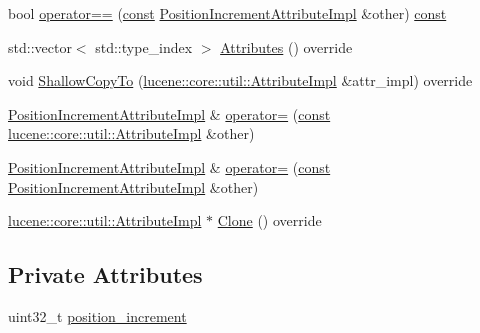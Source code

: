 \begin{DoxyCompactItemize}
\item 
bool \mbox{\hyperlink{classlucene_1_1core_1_1analysis_1_1tokenattributes_1_1PositionIncrementAttributeImpl_a5450f58da2745c914e68e7a650e78cc3}{operator==}} (\mbox{\hyperlink{ZlibCrc32_8h_a2c212835823e3c54a8ab6d95c652660e}{const}} \mbox{\hyperlink{classlucene_1_1core_1_1analysis_1_1tokenattributes_1_1PositionIncrementAttributeImpl}{Position\+Increment\+Attribute\+Impl}} \&other) \mbox{\hyperlink{ZlibCrc32_8h_a2c212835823e3c54a8ab6d95c652660e}{const}}
\item 
std\+::vector$<$ std\+::type\+\_\+index $>$ \mbox{\hyperlink{classlucene_1_1core_1_1analysis_1_1tokenattributes_1_1PositionIncrementAttributeImpl_ab6028133ca375bdcb9774650828e7388}{Attributes}} () override
\item 
void \mbox{\hyperlink{classlucene_1_1core_1_1analysis_1_1tokenattributes_1_1PositionIncrementAttributeImpl_a887e391d3db93f6a8e76b6b464d60547}{Shallow\+Copy\+To}} (\mbox{\hyperlink{classlucene_1_1core_1_1util_1_1AttributeImpl}{lucene\+::core\+::util\+::\+Attribute\+Impl}} \&attr\+\_\+impl) override
\item 
\mbox{\hyperlink{classlucene_1_1core_1_1analysis_1_1tokenattributes_1_1PositionIncrementAttributeImpl}{Position\+Increment\+Attribute\+Impl}} \& \mbox{\hyperlink{classlucene_1_1core_1_1analysis_1_1tokenattributes_1_1PositionIncrementAttributeImpl_a8fccb463e29cc9cb90e7689cc7161488}{operator=}} (\mbox{\hyperlink{ZlibCrc32_8h_a2c212835823e3c54a8ab6d95c652660e}{const}} \mbox{\hyperlink{classlucene_1_1core_1_1util_1_1AttributeImpl}{lucene\+::core\+::util\+::\+Attribute\+Impl}} \&other)
\item 
\mbox{\hyperlink{classlucene_1_1core_1_1analysis_1_1tokenattributes_1_1PositionIncrementAttributeImpl}{Position\+Increment\+Attribute\+Impl}} \& \mbox{\hyperlink{classlucene_1_1core_1_1analysis_1_1tokenattributes_1_1PositionIncrementAttributeImpl_a89b28d766574af0ba1e521adf811fe71}{operator=}} (\mbox{\hyperlink{ZlibCrc32_8h_a2c212835823e3c54a8ab6d95c652660e}{const}} \mbox{\hyperlink{classlucene_1_1core_1_1analysis_1_1tokenattributes_1_1PositionIncrementAttributeImpl}{Position\+Increment\+Attribute\+Impl}} \&other)
\item 
\mbox{\hyperlink{classlucene_1_1core_1_1util_1_1AttributeImpl}{lucene\+::core\+::util\+::\+Attribute\+Impl}} $\ast$ \mbox{\hyperlink{classlucene_1_1core_1_1analysis_1_1tokenattributes_1_1PositionIncrementAttributeImpl_a68907cad12693754f1286678a7c78c21}{Clone}} () override
\end{DoxyCompactItemize}
\subsection*{Private Attributes}
\begin{DoxyCompactItemize}
\item 
uint32\+\_\+t \mbox{\hyperlink{classlucene_1_1core_1_1analysis_1_1tokenattributes_1_1PositionIncrementAttributeImpl_a3de757124d0bf5a9395e8c943c4ee5cf}{position\+\_\+increment}}
\end{DoxyCompactItemize}
